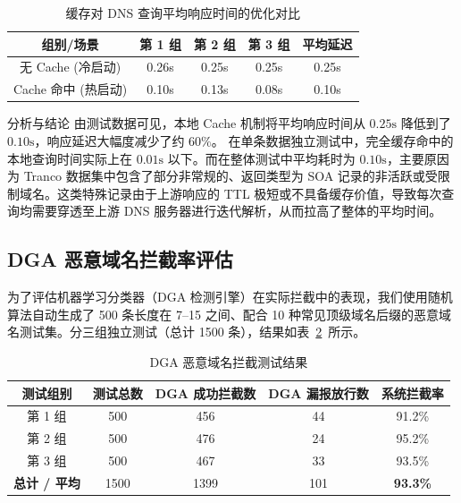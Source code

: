 \documentclass[11pt,a4paper]{ctexart}
\begin{document}
\begin{table}[H]
    \centering
    \color{Charcoal}
    \caption{缓存对 DNS 查询平均响应时间的优化对比}
    \vspace{0.2cm}
    \begin{tabular}{ccccc}
        \toprule
        \textbf{组别/场景} & \textbf{第 1 组} & \textbf{第 2 组} & \textbf{第 3 组} & \textbf{平均延迟} \\
        \midrule
        无 Cache (冷启动) & 0.26s & 0.25s & 0.25s & 0.25s \\
        Cache 命中 (热启动) & 0.10s & 0.13s & 0.08s & 0.10s \\
        \bottomrule
    \end{tabular}
    \label{tab:cache_latency}
\end{table}

\begin{notebox}{分析与结论}
由测试数据可见，本地 Cache 机制将平均响应时间从 $0.25\text{s}$ 降低到了 $0.10\text{s}$，响应延迟大幅度减少了约 $60\%$。
在单条数据独立测试中，完全缓存命中的本地查询时间实际上在 $0.01\text{s}$ 以下。而在整体测试中平均耗时为 $0.10\text{s}$，主要原因为 Tranco 数据集中包含了部分非常规的、返回类型为 SOA 记录的非活跃或受限制域名。这类特殊记录由于上游响应的 TTL 极短或不具备缓存价值，导致每次查询均需要穿透至上游 DNS 服务器进行迭代解析，从而拉高了整体的平均时间。
\end{notebox}

\subsection{DGA 恶意域名拦截率评估}
为了评估机器学习分类器（DGA 检测引擎）在实际拦截中的表现，我们使用随机算法自动生成了 500 条长度在 7--15 之间、配合 10 种常见顶级域名后缀的恶意域名测试集。分三组独立测试（总计 1500 条），结果如表~\ref{tab:dga_block}~所示。

\begin{table}[H]
    \centering
    \color{Charcoal}
    \caption{DGA 恶意域名拦截测试结果}
    \vspace{0.2cm}
    \begin{tabular}{ccccc}
        \toprule
        \textbf{测试组别} & \textbf{测试总数} & \textbf{DGA 成功拦截数} & \textbf{DGA 漏报放行数} & \textbf{系统拦截率} \\
        \midrule
        第 1 组 & 500 & 456 & 44 & 91.2\% \\
        第 2 组 & 500 & 476 & 24 & 95.2\% \\
        第 3 组 & 500 & 467 & 33 & 93.5\% \\
        \midrule
        \textbf{总计 / 平均} & 1500 & 1399 & 101 & \textbf{93.3\%} \\
        \bottomrule
    \end{tabular}
    \label{tab:dga_block}
\end{table}
\end{document}

